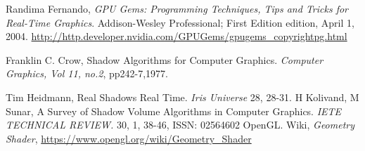 \documentclass[a4paper, 12pt]{article}
\begin{document}
\begin{thebibliography}{9}
	Randima Fernando,
	\emph{GPU Gems: Programming Techniques, Tips and Tricks for Real-Time Graphics}.
	Addison-Wesley Professional; First Edition edition, April 1, 2004.
	\url{http://http.developer.nvidia.com/GPUGems/gpugems\_copyrightpg.html}

  Franklin C. Crow,
  Shadow Algorithms for Computer Graphics.
  \emph{Computer Graphics, Vol 11, no.2}, pp242-7,1977.

  Tim Heidmann,
  Real Shadows Real Time.
  \emph{Iris Universe} 28, 28-31.
   H Kolivand, M Sunar,
   A Survey of Shadow Volume Algorithms in Computer Graphics.
   \emph{IETE TECHNICAL REVIEW.} 30, 1, 38-46, ISSN: 02564602
  OpenGL. Wiki,
  \emph{Geometry Shader},
  \url{https://www.opengl.org/wiki/Geometry_Shader}
\end{thebibliography}
\end{document}
